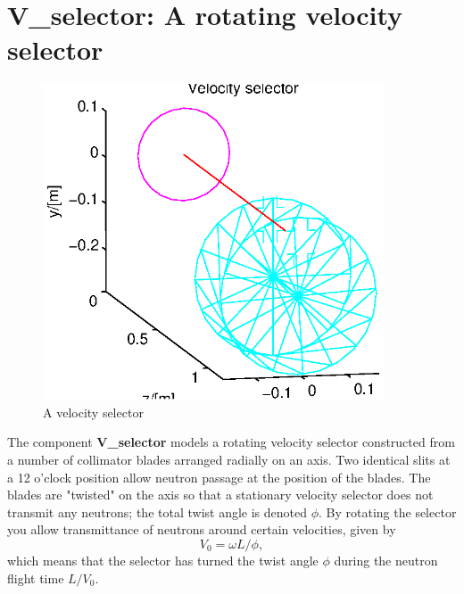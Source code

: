\section{V\_selector: A rotating velocity selector}
\label{vselector}


\begin{figure}
  \begin{center}
    \includegraphics[width=0.9\textwidth]{figures/vselector.eps}
  \end{center}
\caption{A velocity selector}
\label{f:vselector}
\end{figure}

The component {\bf V\_selector} models a rotating velocity
selector constructed from a number of collimator blades
arranged radially on an axis. Two identical slits
at a 12 o'clock position allow
neutron passage at the position of the blades.
The blades are "twisted" on the axis so that a stationary
velocity selector does not transmit any neutrons; the total
twist angle is denoted $\phi$.
By rotating the selector you allow
transmittance of neutrons around certain velocities, given by
\begin{equation}
V_0 = \omega L / \phi ,
\end{equation}
which means that the selector has turned the twist angle
$\phi$ during the neutron flight time $L/V_0$.

